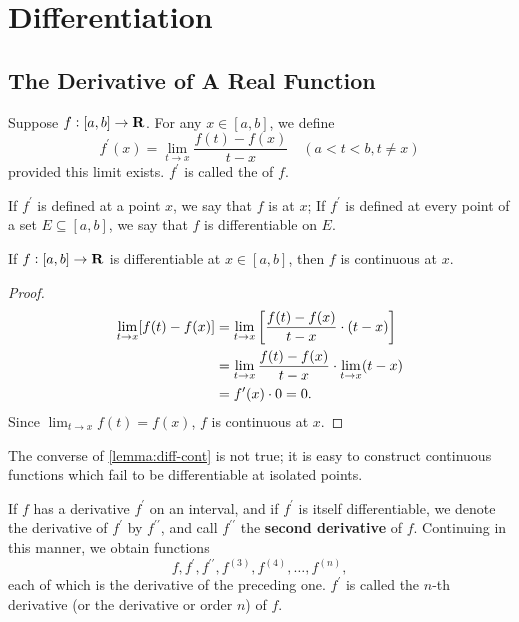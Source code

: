 \chapter{Differentiation}
\section{The Derivative of A Real Function}
\begin{definition}[Derivative]
Suppose $f:[a,b]\to\mathbf R$. For any $x\in[a,b]$, we define
\[f^\prime(x)=\lim_{t\to x}\frac{f(t)-f(x)}{t-x}\quad(a<t<b,t\neq x)\]
provided this limit exists. $f^\prime$ is called the  of $f$.

If $f^\prime$ is defined at a point $x$, we say that $f$ is  at $x$; If $f^\prime$ is defined at every point of a set $E\subseteq[a,b]$, we say that $f$ is differentiable on $E$.
\end{definition}

\begin{lemma}\label{lemma:diff-cont}
If $f:[a,b]\to\mathbf R$ is differentiable at $x\in[a,b]$, then $f$ is continuous at $x$.
\end{lemma}

\begin{proof}
\begin{align*}
\lim_{t\to x}[f(t)-f(x)]
&=\lim_{t\to x}\left[\frac{f(t)-f(x)}{t-x}\cdot(t-x)\right]\\
&=\lim_{t\to x}\frac{f(t)-f(x)}{t-x}\cdot\lim_{t\to x}(t-x)\\
&=f^\prime(x)\cdot0=0.
\end{align*}
Since $\displaystyle\lim_{t\to x}f(t)=f(x)$, $f$ is continuous at $x$.
\end{proof}

\begin{remark}
The converse of \cref{lemma:diff-cont} is not true; it is easy to construct continuous functions which fail to be differentiable at isolated points.
\end{remark}

\begin{notation}
If $f$ has a derivative $f^\prime$ on an interval, and if $f^\prime$ is itself differentiable, we denote the derivative of $f^\prime$ by $f^{\prime\prime}$, and call $f^{\prime\prime}$ the \textbf{second derivative} of $f$. Continuing in this manner, we obtain functions
\[f,f^\prime,f^{\prime\prime},f^{(3)},f^{(4)},\dots,f^{(n)},\]
each of which is the derivative of the preceding one. $f^\prime$ is called the $n$-th derivative (or the derivative or order $n$) of $f$.
\end{notation}

